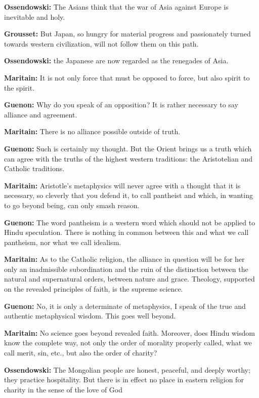 \textbf{Ossendowski:} The Asians think that the war of Asia against Europe is inevitable and holy.

\textbf{Grousset:} But Japan, so hungry for material progress and passionately turned towards western civilization, will not follow them on this path.

\textbf{Ossendowski:} the Japanese are now regarded as the renegades of Asia.

\textbf{Maritain:} It is not only force that must be opposed to force, but also spirit to the spirit.

\textbf{Guenon:} Why do you speak of an opposition? It is rather necessary to say alliance and agreement.

\textbf{Maritain:} There is no alliance possible outside of truth.

\textbf{Guenon:} Such is certainly my thought. But the Orient brings us a truth which can agree with the truths of the highest western traditions: the Aristotelian and Catholic traditions.

\textbf{Maritain:} Aristotle's metaphysics will never agree with a thought that it is necessary, so cleverly that you defend it, to call pantheist and which, in wanting to go beyond being, can only smash reason.

\textbf{Guenon:} The word pantheism is a western word which should not be applied to Hindu speculation. There is nothing in common between this and what we call pantheism, nor what we call idealism.

\textbf{Maritain:} As to the Catholic religion, the alliance in question will be for her only an inadmissible subordination and the ruin of the distinction between the natural and supernatural orders, between nature and grace. Theology, supported on the revealed principles of faith, is the supreme science.

\textbf{Guenon:} No, it is only a determinate of metaphysics, I speak of the true and authentic metaphysical wisdom. This goes well beyond.

\textbf{Maritain:} No science goes beyond revealed faith. Moreover, does Hindu wisdom know the complete way, not only the order of morality properly called, what we call merit, sin, etc., but also the order of charity?

\textbf{Ossendowski:} The Mongolian people are honest, peaceful, and deeply worthy; they practice hospitality. But there is in effect no place in eastern religion for charity in the sense of the love of God

